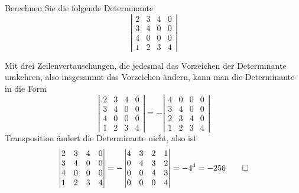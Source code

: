 Berechnen Sie die folgende Determinante
\[
\left|
\begin{matrix}
2&3&4&0\\
3&4&0&0\\
4&0&0&0\\
1&2&3&4
\end{matrix}
\right|
\]

\begin{loesung}
Mit drei Zeilenvertauschungen, die jedesmal das Vorzeichen der
Determinante umkehren, also insgesammt das Vorzeichen ändern,
kann man die Determinante in die Form
\[
\left|
\begin{matrix}
2&3&4&0\\
3&4&0&0\\
4&0&0&0\\
1&2&3&4
\end{matrix}
\right|
=
-\left|
\begin{matrix}
4&0&0&0\\
3&4&0&0\\
2&3&4&0\\
1&2&3&4
\end{matrix}
\right|
\]
Transposition ändert die Determinante nicht, also ist
\[
\left|
\begin{matrix}
2&3&4&0\\
3&4&0&0\\
4&0&0&0\\
1&2&3&4
\end{matrix}
\right|
=
-\left|
\begin{matrix}
4&3&2&1\\
0&4&3&2\\
0&0&4&3\\
0&0&0&4
\end{matrix}
\right|=-4^4=-256
\qedhere
\]
\end{loesung}

